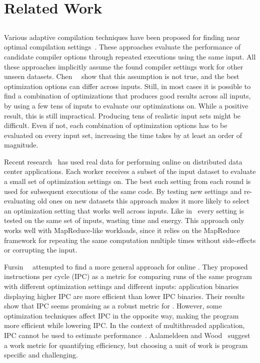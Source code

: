 \section{Related Work}\label{sec:relatedwork}

\subsection{{\IterComp}}
Various adaptive compilation techniques have been proposed for finding near optimal compilation
settings~\cite{agakov06,kulkarni04,stephenson03}. These approaches evaluate the performance of candidate compiler options through repeated
executions using the same input. All these approaches implicitly assume the found compiler settings work for other unseen datasets.
Chen~\etal~\cite{chen10,chen12a} show that this assumption is not true, and the best optimization options can differ across inputs. Still,
in most cases it is possible to find a combination of optimizations that produces good results across all inputs, by using a few tens of
inputs to evaluate our optimizations on. While a positive result, this is still impractical. Producing tens of realistic input sets might
be difficult. Even if not, each combination of optimization options has to be evaluated on every input set, increasing the time \itercomp
takes by at least an order of magnitude.

Recent research~\cite{chen12b,fang15} has used real data for performing online {\itercomp} on distributed data center applications. Each
worker receives a subset of the input dataset to evaluate a small set of optimization settings on. The best such setting from each round
is used for subsequent executions of the same code. By testing new settings and re-evaluating old ones on new datasets this approach makes
it more likely to select an optimization setting that works well across inputs. Like in~\cite{chen10} every setting is tested on the same
set of inputs, wasting time and energy. This approach only works well with MapReduce-like workloads, since it relies on the MapReduce
framework for repeating the same computation multiple times without side-effects or corrupting the input.

Fursin~\etal~\cite{fursin07} attempted to find a more general approach for online \itercomp. They proposed instructions per cycle (IPC) as
a metric for comparing runs of the same program with different optimization settings and different inputs: application binaries displaying
higher IPC are more efficient than lower IPC binaries. Their results show that IPC seems promising as a robust metric for {\itercomp}.
However, some optimization techniques affect IPC in the opposite way, making the program more efficient while lowering IPC. In the context
of multithreaded application, IPC cannot be used to estimate performance~\cite{alameldeen06,eyerman08}. Aalameldeen and
Wood~\cite{alameldeen06} suggest a work metric for quantifying efficiency, but choosing a unit of work is program specific and challenging.

